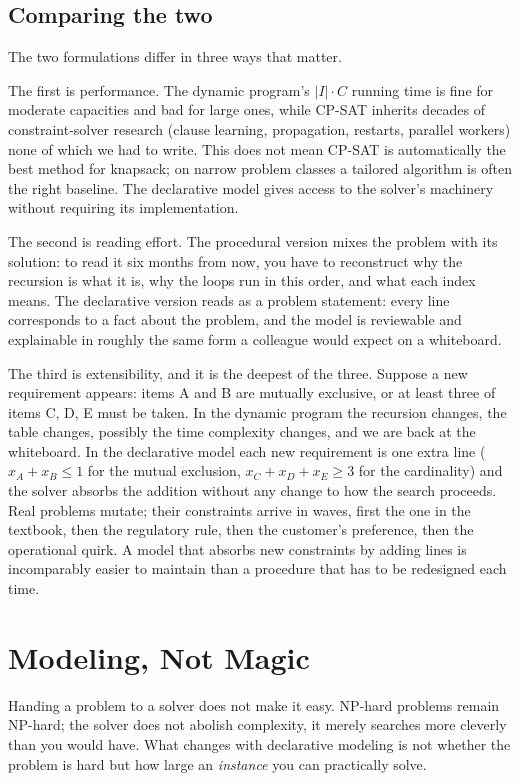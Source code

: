 \subsection{Comparing the two}\label{sec:1.1.3}

The two formulations differ in three ways that matter.

The first is performance. The dynamic program's \(\lvert I \rvert
\cdot C\) running time is fine for moderate capacities and bad for
large ones, while
CP-SAT inherits decades of constraint-solver research (clause
learning, propagation, restarts, parallel workers) none of which we
had to write. This does not mean CP-SAT is automatically the best method
for knapsack; on narrow problem classes a tailored algorithm is often
the right baseline. The declarative model gives access to the solver's
machinery without requiring its implementation.

The second is reading effort. The procedural version mixes the problem
with its solution: to read it six months from now, you have to
reconstruct why the recursion is what it is, why the loops run in this
order, and what each index means. The declarative version reads as a
problem statement: every line corresponds to a fact about the
problem, and the model is reviewable and explainable in roughly the same
form a colleague would expect on a whiteboard.

The third is extensibility, and it is the deepest of the three. Suppose
a new requirement appears: items A and B are mutually exclusive, or at
least three of items C, D, E must be taken. In the dynamic program the
recursion changes, the table changes, possibly the time complexity
changes, and we are back at the whiteboard. In the declarative model
each new requirement is one extra line (\(x_A + x_B \le 1\) for the
mutual exclusion, \(x_C + x_D + x_E \ge 3\) for the cardinality) and
the solver absorbs the addition without any change to how the search
proceeds. Real problems mutate; their constraints arrive in waves, first
the one in the textbook, then the regulatory rule, then the customer's
preference, then the operational quirk. A model that absorbs new
constraints by adding lines is incomparably easier to maintain than a
procedure that has to be redesigned each time.

\section{Modeling, Not Magic}\label{sec:1.2}

Handing a problem to a solver does not make it easy. NP-hard problems
remain NP-hard; the solver does not abolish complexity, it merely
searches more cleverly than you would have. What changes with
declarative modeling is not whether the problem is hard but how large an
\emph{instance} you can practically solve.


